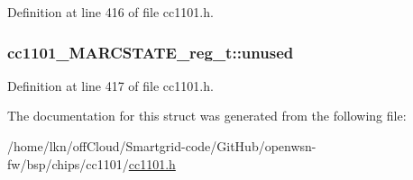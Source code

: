 Definition at line 416 of file cc1101.\+h.

\subsubsection[{\texorpdfstring{unused}{unused}}]{ cc1101\+\_\+\+M\+A\+R\+C\+S\+T\+A\+T\+E\+\_\+reg\+\_\+t\+::unused}\hypertarget{structcc1101___m_a_r_c_s_t_a_t_e__reg__t_a992799c1387939b207b0a360acad2812}{}\label{structcc1101___m_a_r_c_s_t_a_t_e__reg__t_a992799c1387939b207b0a360acad2812}


Definition at line 417 of file cc1101.\+h.



The documentation for this struct was generated from the following file\+:\begin{DoxyCompactItemize}
\item 
/home/lkn/off\+Cloud/\+Smartgrid-\/code/\+Git\+Hub/openwsn-\/fw/bsp/chips/cc1101/\hyperlink{cc1101_8h}{cc1101.\+h}\end{DoxyCompactItemize}
